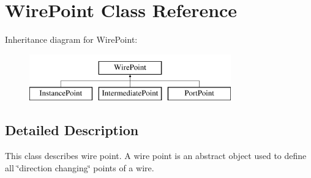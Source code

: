 \hypertarget{class_open_chams_1_1_wire_point}{\section{Wire\-Point Class Reference}
\label{class_open_chams_1_1_wire_point}
}
Inheritance diagram for Wire\-Point\-:\begin{figure}[H]
\begin{center}
\leavevmode
\includegraphics[height=2.000000cm]{class_open_chams_1_1_wire_point}
\end{center}
\end{figure}


\subsection{Detailed Description}
This class describes wire point. A wire point is an abstract object used to define all \char`\"{}direction changing\char`\"{} points of a wire. 